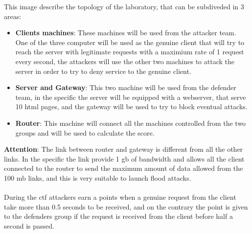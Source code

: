 \documentclass[14pt]{article}
\begin{document}
This image describe the topology of the laboratory, that can be subdiveded in 3 areas:
\begin{itemize}
	\item \textbf{Clients machines}: These machines will be used from the attacker team. One of the three computer will be used as the genuine client that will try to reach the server with legitimate requests with a maximium rate of 1 request every second, the attackers will use the other two machines to attack the server in order to try to deny service to the genuine client.
	
	\item \textbf{Server and Gateway}: This two machine will be used from the defender team, in the specific the server will be equipped with a webserver, that serve 10 html pages, and the gateway will be used to try to block eventual attacks.
	
	\item \textbf{Router}: This machine will connect all the machines controlled from the two groups and will be used to calculate the score.
\end{itemize}

\textbf{Attention}: The link between router and gateway is different from all the other links. In the specific the link provide 1 gb of bandwidth and allows all the client connected to the router to send the maximum amount of data allowed from the 100 mb links, and this is very suitable to launch flood attacks.
\\
\\
During the ctf attackers earn a points when a genuine request from the client take more than 0.5 seconds to be received, and on the contrary the point is given to the defenders group if the request is received from the client before half a second is passed. 
\end{document}
